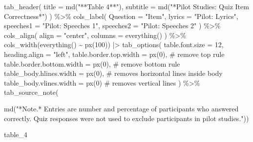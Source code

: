 \documentclass[
  man]{apa7}
\newenvironment{Shaded}{\begin{snugshade}}{\end{snugshade}}
\newcommand{\AttributeTok}[1]{\textcolor[rgb]{0.40,0.45,0.13}{#1}}
\newcommand{\CommentTok}[1]{\textcolor[rgb]{0.37,0.37,0.37}{#1}}
\newcommand{\DecValTok}[1]{\textcolor[rgb]{0.68,0.00,0.00}{#1}}
\newcommand{\FunctionTok}[1]{\textcolor[rgb]{0.28,0.35,0.67}{#1}}
\newcommand{\NormalTok}[1]{\textcolor[rgb]{0.00,0.23,0.31}{#1}}
\newcommand{\SpecialCharTok}[1]{\textcolor[rgb]{0.37,0.37,0.37}{#1}}
\newcommand{\StringTok}[1]{\textcolor[rgb]{0.13,0.47,0.30}{#1}}
\begin{document}
\begin{Shaded}
\begin{Highlighting}[]
  \FunctionTok{tab\_header}\NormalTok{(}
    \AttributeTok{title =} \FunctionTok{md}\NormalTok{(}\StringTok{"**Table 4**"}\NormalTok{),}
    \AttributeTok{subtitle =} \FunctionTok{md}\NormalTok{(}\StringTok{"*Pilot Studies: Quiz Item Correctness*"}\NormalTok{)}
\NormalTok{  ) }\SpecialCharTok{\%\textgreater{}\%}
  \FunctionTok{cols\_label}\NormalTok{(}
    \AttributeTok{Question =} \StringTok{"Item"}\NormalTok{,}
    \AttributeTok{lyrics =} \StringTok{"Pilot: Lyrics"}\NormalTok{,}
    \AttributeTok{speeches1 =} \StringTok{"Pilot: Speeches 1"}\NormalTok{,}
    \AttributeTok{speeches2 =} \StringTok{"Pilot: Speeches 2"}
\NormalTok{  ) }\SpecialCharTok{\%\textgreater{}\%}
  \FunctionTok{cols\_align}\NormalTok{(}
    \AttributeTok{align =} \StringTok{"center"}\NormalTok{,}
    \AttributeTok{columns =} \FunctionTok{everything}\NormalTok{()}
\NormalTok{  ) }\SpecialCharTok{\%\textgreater{}\%}
  \FunctionTok{cols\_width}\NormalTok{(}\FunctionTok{everything}\NormalTok{() }\SpecialCharTok{\textasciitilde{}} \FunctionTok{px}\NormalTok{(}\DecValTok{100}\NormalTok{)) }\SpecialCharTok{|\textgreater{}}
  \FunctionTok{tab\_options}\NormalTok{(}
    \AttributeTok{table.font.size =} \DecValTok{12}\NormalTok{,}
    \AttributeTok{heading.align =} \StringTok{"left"}\NormalTok{,}
    \AttributeTok{table.border.top.width =} \FunctionTok{px}\NormalTok{(}\DecValTok{0}\NormalTok{),       }\CommentTok{\# remove top rule}
    \AttributeTok{table.border.bottom.width =} \FunctionTok{px}\NormalTok{(}\DecValTok{0}\NormalTok{),    }\CommentTok{\# remove bottom rule}
    \AttributeTok{table\_body.hlines.width =} \FunctionTok{px}\NormalTok{(}\DecValTok{0}\NormalTok{),   }\CommentTok{\# removes horizontal lines inside body}
    \AttributeTok{table\_body.vlines.width =} \FunctionTok{px}\NormalTok{(}\DecValTok{0}\NormalTok{)    }\CommentTok{\# removes vertical lines}
\NormalTok{  ) }\SpecialCharTok{\%\textgreater{}\%}
  \FunctionTok{tab\_source\_note}\NormalTok{(}
    
    \FunctionTok{md}\NormalTok{(}\StringTok{"*Note.* Entries are number and percentage of participants who answered correctly. Quiz responses were not used to exclude participants in pilot studies."}\NormalTok{))}

\NormalTok{table\_4}
\end{Highlighting}
\end{Shaded}
\end{document}
